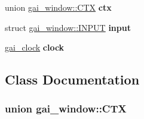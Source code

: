 \begin{DoxyCompactItemize}
\mbox{\label{structgai__window_ae0483cf458672fc68c6f000670102b45}} 
union \hyperlink{structgai__window_uniongai__window_1_1_c_t_x}{gai\+\_\+window\+::\+C\+TX} {\bfseries ctx}
\item 
\mbox{\label{structgai__window_a73a5158ee13d09c11968ff8237542c8b}} 
struct \hyperlink{structgai__window_structgai__window_1_1_i_n_p_u_t}{gai\+\_\+window\+::\+I\+N\+P\+UT} {\bfseries input}
\item 
\mbox{\label{structgai__window_a726b3b659d1af3101f4c1a7228bf3950}} 
\hyperlink{gai_8h_structgai__clock}{gai\+\_\+clock} {\bfseries clock}
\end{DoxyCompactItemize}


\subsection{Class Documentation}
\label{uniongai__window_1_1_c_t_x}
\subsubsection{union gai\+\_\+window\+:\+:C\+TX}


